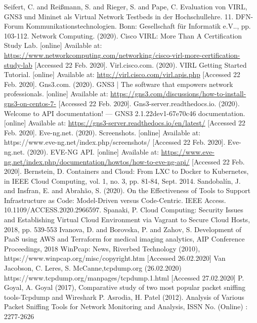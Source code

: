 \documentclass[conference]{IEEEtran}
\begin{document}
\begin{thebibliography}{00}
 Seifert, C. and Reißmann, S. and Rieger, S. and Pape, C. Evaluation von VIRL, GNS3 und Mininet als Virtual Network Testbeds in der Hochschullehre. 11. DFN-Forum Kommunikationstechnologien. Bonn: Gesellschaft für Informatik e.V.., pp. 103-112.
 Network Computing. (2020). Cisco VIRL: More Than A Certification Study Lab. [online] Available at: \url{https://www.networkcomputing.com/networking/cisco-virl-more-certification-study-lab} [Accessed 22 Feb. 2020].
 Virl.cisco.com. (2020). VIRL Getting Started Tutorial. [online] Available at: \url{http://virl.cisco.com/virl.apis.php} [Accessed 22 Feb. 2020].
 Gns3.com. (2020). GNS3 | The software that empowers network professionals. [online] Available at: \url{https://gns3.com/discussions/how-to-install-gns3-on-centos-7-} [Accessed 22 Feb. 2020].
 Gns3-server.readthedocs.io. (2020). Welcome to API documentation! — GNS3 2.1.22dev1-67e70c46 documentation. [online] Available at: \url{https://gns3-server.readthedocs.io/en/latest/} [Accessed 22 Feb. 2020].
 Eve-ng.net. (2020). Screenshots. [online] Available at: https://www.eve-ng.net/index.php/screenshots/ [Accessed 22 Feb. 2020].
 Eve-ng.net. (2020). EVE-NG API. [online] Available at: \url{https://www.eve-ng.net/index.php/documentation/howtos/how-to-eve-ng-api/} [Accessed 22 Feb. 2020].
 Bernstein, D. Containers and Cloud: From LXC to Docker to Kubernetes, in IEEE Cloud Computing, vol. 1, no. 3, pp. 81-84, Sept. 2014.
 Sandobalín, J. and Insfran, E. and Abrahão, S. (2020). On the Effectiveness of Tools to Support Infrastructure as Code: Model-Driven versus Code-Centric. IEEE Access. 10.1109/ACCESS.2020.2966597.
 Spanaki, P. Cloud Computing: Security Issues and Establishing Virtual Cloud Environment via Vagrant to Secure Cloud Hosts, 2018, pp. 539-553
 Ivanova, D. and Borovska, P. and Zahov, S. Development of PaaS using AWS and Terraform for medical imaging analytics, AIP Conference Proceedings, 2018
 WinPcap: News, Riverbed Technology (2010), https://www.winpcap.org/misc/copyright.htm [Accessed 26.02.2020]
 Van Jacobson, C. Leres, S. McCanne,tcpdump.org (26.02.2020) https://www.tcpdump.org/manpages/tcpdump.1.html [Accessed 27.02.2020]
 P. Goyal, A. Goyal (2017), Comparative study of two most popular packet sniffing tools-Tcpdump and Wireshark
 P. Asrodia, H. Patel (2012). Analysis  of  Various  Packet  Sniffing  Tools  for Network  Monitoring  and  Analysis, ISSN  No.  (Online)  :  2277-2626

\end{thebibliography}
\end{document}
